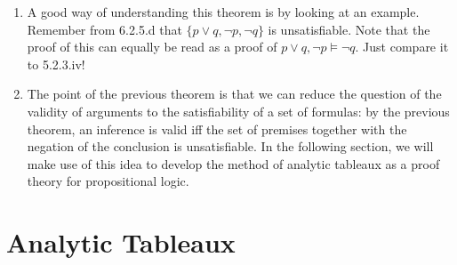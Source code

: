 \begin{enumerate}[\thesection.1]
\begin{proof}
\begin{itemize}
				\item ($2.\Rightarrow 1.$) Suppose (for conditional proof) that $\Gamma\cup\{\neg\phi\}$ is unsatisfiable, i.e. there exists no valuation $v$ such that $\llbracket \psi\rrbracket_v=1$ for all $\psi\in \Gamma\cup\{\neg\phi\}$. We want to show that $\Gamma\vDash\phi$ and do so indirectly. So, suppose that $\Gamma\nvDash\phi$; that is, suppose that there exists a valuation $v$ such that $\llbracket \psi\rrbracket_v=1$ for all $\psi\in \Gamma$ and $\llbracket \phi\rrbracket_v=0$. But then, since $\llbracket\neg\phi\rrbracket_v=1-\llbracket\phi\rrbracket$, it follows that $\llbracket\neg\phi\rrbracket_v=1$. And this just means that $\llbracket \psi\rrbracket_v=1$ for all $\psi\in \Gamma\cup\{\neg\phi\}$---in contradiction to  $\Gamma\cup\{\neg\phi\}$ being unsatisfiable. Hence $\Gamma\vDash\phi$, as desired.
			
			\end{itemize}
			\end{proof}
		
	\item A good way of understanding this theorem is by looking at an example. Remember from 6.2.5.d that $\{p\lor q, \neg p, \neg q\}$ is unsatisfiable. Note that the proof of this can equally be read as a proof of $p\lor q,\neg p\vDash\neg q$. Just compare it to 5.2.3.iv!
		
	\item The point of the previous theorem is that we can reduce the question of the validity of arguments to the satisfiability of a set of formulas: by the previous theorem, an inference is valid iff the set of premises together with the negation of the conclusion is unsatisfiable. In the following section, we will make use of this idea to develop the method of analytic tableaux as a proof theory for propositional logic.
		
	\end{enumerate}

\section{Analytic Tableaux}
			
